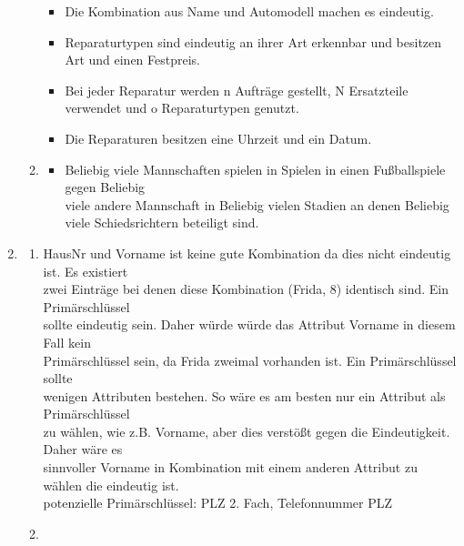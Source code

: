 \documentclass{article}
\begin{document}
\begin{enumerate}
\begin{enumerate}
\begin{itemize}
                        \item Die Kombination aus Name und Automodell machen es eindeutig.
                        \item Reparaturtypen sind eindeutig an ihrer Art erkennbar und besitzen Art und einen Festpreis.
                        \item Bei jeder Reparatur werden n Aufträge gestellt, N Ersatzteile verwendet und o Reparaturtypen genutzt.
                        \item Die Reparaturen besitzen eine Uhrzeit und ein Datum.
                    \end{itemize}
                \item   
                    \begin{itemize}
                        \item Beliebig viele Mannschaften spielen in Spielen in einen Fußballspiele gegen Beliebig \\
                        viele andere Mannschaft in Beliebig vielen Stadien an denen Beliebig viele Schiedsrichtern beteiligt sind.
                    \end{itemize}
             \end{enumerate}
        \item 
            \begin{enumerate}
                \item 
                    HausNr und Vorname ist keine gute Kombination da dies nicht eindeutig ist. Es existiert \\
                    zwei Einträge bei denen diese Kombination (Frida, 8) identisch sind. Ein Primärschlüssel \\
                    sollte eindeutig sein. Daher würde würde das Attribut Vorname in diesem Fall kein \\
                    Primärschlüssel sein, da Frida zweimal vorhanden ist. Ein Primärschlüssel sollte \\
                    wenigen Attributen bestehen. So wäre es am besten nur ein Attribut als Primärschlüssel\\
                     zu wählen, wie z.B. Vorname, aber dies verstößt gegen die Eindeutigkeit. Daher wäre es \\
                     sinnvoller Vorname in Kombination mit einem anderen Attribut zu wählen die eindeutig ist.\\
                    potenzielle Primärschlüssel: PLZ 2. Fach, Telefonnummer PLZ 
                \item

\end{enumerate}
\end{enumerate}
\end{document}

